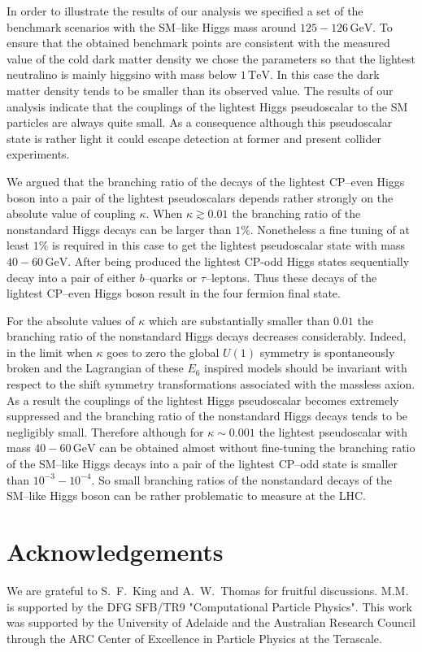 \documentclass[12pt,a4paper]{article}
\begin{document}
In order to illustrate the results of our analysis we
specified a set of the benchmark scenarios with the SM--like Higgs mass around $125-126\,\mbox{GeV}$.
To ensure that the obtained benchmark points are consistent with the measured value of the cold dark matter
density we chose the parameters so that the lightest neutralino is mainly higgsino with mass below $1\,\mbox{TeV}$.
In this case the dark matter density tends to be smaller than its observed value. The results of our analysis indicate
that the couplings of the lightest Higgs pseudoscalar to the SM particles are always quite small. As a consequence
although this pseudoscalar state is rather light it could escape detection at former and present collider experiments.

We argued that the branching ratio of the decays of the lightest CP--even Higgs boson into a pair of the lightest
pseudoscalars depends rather strongly on the absolute value of coupling $\kappa$. When $\kappa\gtrsim 0.01$
the branching ratio of the nonstandard Higgs decays can be larger than $1\%$. Nonetheless a fine tuning of at least
$1\%$ is required in this case to get the lightest pseudoscalar state with mass $40-60\,\mbox{GeV}$.
After being produced the lightest CP-odd Higgs states sequentially decay into a pair of either $b$--quarks or
$\tau$--leptons. Thus these decays of the lightest CP--even Higgs boson result in the four fermion final state.

For the absolute values of $\kappa$ which are substantially smaller than $0.01$ the branching ratio of the
nonstandard Higgs decays decreases considerably. Indeed, in the limit when $\kappa$ goes to zero the
global $U(1)$ symmetry is spontaneously broken and the Lagrangian of these $E_6$ inspired models should be
invariant with respect to the shift symmetry transformations associated with the massless axion. As a result the
couplings of the lightest Higgs pseudoscalar becomes extremely suppressed and the branching ratio of the
nonstandard Higgs decays tends to be negligibly small. Therefore although for $\kappa\sim 0.001$ the lightest
pseudoscalar with mass $40-60\,\mbox{GeV}$ can be obtained almost without fine-tuning the branching ratio
of the SM--like Higgs decays into a pair of the  lightest CP--odd state is smaller than $10^{-3}-10^{-4}$.
So small branching ratios of the nonstandard decays of the SM--like Higgs boson can be rather problematic
to measure at the LHC.

\vspace{-5mm}
\section*{Acknowledgements}
\vspace{-3mm}
We are grateful to S.~F.~King and A.~W.~Thomas for  fruitful discussions.
M.M. is supported by the DFG SFB/TR9 "Computational Particle Physics".
This work was supported by the University of Adelaide and the Australian Research Council through the ARC
Center of Excellence in Particle Physics at the Terascale. 
\end{document}

